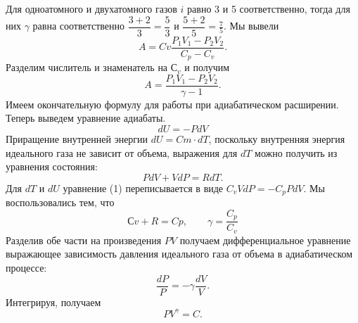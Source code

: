 	Для одноатомного и двухатомного газов $i$ равно 3 и 5 соответственно, тогда для них $\gamma$ равна соответственно $\dfrac{3+2}{3} = \dfrac{5}{3}$ и $\dfrac{5+2}{5} = \frac{7}{5}$. Мы вывели 
		$$A = Cv \frac{P_1V_1-P_2V_2}{C_p-C_v}.$$
	Разделим числитель и знаменатель на $С_v$ и получим
		$$A = \frac{P_1V_1-P_2V_2}{\gamma-1}.$$
	Имеем окончательную формулу для работы при адиабатическом расширении. Теперь выведем уравнение адиабаты.
		$$ dU=-PdV$$ %
	Приращение внутренней энергии $dU = Cm\cdot dT$, поскольку внутренняя энергия идеального газа не зависит от объема, выражения для $dT$ можно получить из уравнения состояния:
		$$PdV +VdP = RdT.$$
	Для $dT$ и $dU$ уравнение (1) переписывается в виде $C_v VdP=-C_p PdV$. 
	Мы воспользовались тем, что 
		$$Сv + R = Cp, \qquad \gamma  = \frac{C_p}{C_v}$$
	Разделив обе части на произведения $PV$ получаем дифференциальное уравнение выражающее зависимость давления идеального газа от объема в адиабатическом процессе:
		$$\frac{dP}{P} = -\gamma \frac{dV}{V}.$$
	Интегрируя, получаем
		$$PV^\gamma  = C.$$
